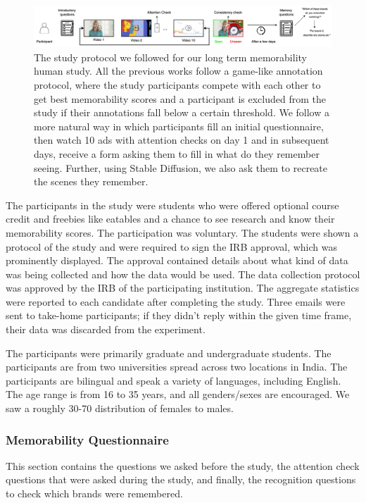 \begin{landscape}
    
\begin{figure}[!h]
    \centering
    \includegraphics[width=1.5\textwidth]{images/Content-Memorability-final.jpg}
    \caption{The study protocol we followed for our long term memorability human study. All the previous works follow a game-like annotation protocol, where the study participants compete with each other to get best memorability scores and a participant is excluded from the study if their annotations fall below a certain threshold. We follow a more natural way in which participants fill an initial questionnaire, then watch 10 ads with attention checks on day 1 and in subsequent days, receive a form asking them to fill in what do they remember seeing. Further, using Stable Diffusion, we also ask them to recreate the scenes they remember.}
    \label{fig:study protocol}
\end{figure}
\end{landscape}


The participants in the study were students who were offered optional course credit and freebies like eatables and a chance to see research and know their memorability scores. The participation was voluntary. The students were shown a protocol of the study and were required to sign the IRB approval, which was prominently displayed. The approval contained details about what kind of data was being collected and how the data would be used. The data collection protocol was approved by the IRB of the participating institution. The aggregate statistics were reported to each candidate after completing the study. Three emails were sent to take-home participants; if they didn't reply within the given time frame, their data was discarded from the experiment. 


The participants were primarily graduate and undergraduate students. The participants are from two universities spread across two locations in India. The participants are bilingual and speak a variety of languages, including English. The age range is from 16 to 35 years, and all genders/sexes are encouraged. We saw a roughly 30-70 distribution of females to males. 


\subsubsection{Memorability Questionnaire}
\label{sec:Memorability Questionnaire}
This section contains the questions we asked before the study, the attention check questions that were asked during the study, and finally, the recognition questions to check which brands were remembered.



